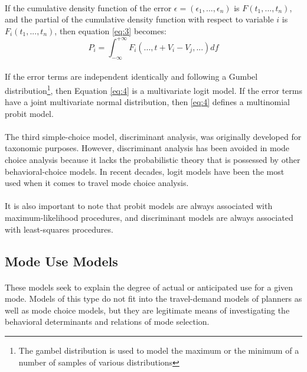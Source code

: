 \paragraph{}If the cumulative density function of the error $\epsilon =(\epsilon_1, . . . , \epsilon_n)$ is $F(t_1, . . . , t_n)$, and the partial of the cumulative density function with respect to variable $i$ is $F_i(t_1, . . . , t_n)$, then equation \ref{eq:3} becomes:
\begin{equation}\label{eq:4}
P_i = 	\int_{-\infty}^{+\infty} F_i(. . . , t + V_i - V_j, . . .)df
\end{equation}
\paragraph{}If the error terms are independent identically  and following a Gumbel distribution\footnote{The gambel distribution is used to model the maximum or the minimum of a number of samples of various distributions}, then Equation \ref{eq:4} is a multivariate logit model. If the error terms have a joint multivariate normal distribution, then \ref{eq:4} defines a multinomial probit model. 
\paragraph{}The third simple-choice model, discriminant analysis, was originally developed for taxonomic purposes. However, discriminant analysis has been avoided in mode choice analysis because it lacks the probabilistic theory that is possessed by other behavioral-choice models. In recent decades, logit models have been the most used when it comes to travel mode choice analysis.
\paragraph{}It is also important to note that probit models are always associated with maximum-likelihood procedures, and discriminant models are always associated with least-squares procedures.

\subsection{Mode Use Models}
\paragraph{}These models seek to explain the degree of actual or anticipated use for a given mode. Models of this type do not fit into the travel-demand models of planners as well as mode choice models, but they are legitimate means of investigating the behavioral determinants and relations of mode selection.
